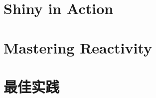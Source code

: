\documentclass{book}
\begin{document}
\frontmatter
\tableofcontents
\mainmatter



\part{Shiny in Action}







\part{Mastering Reactivity}




\part{最佳实践}




\end{document}

